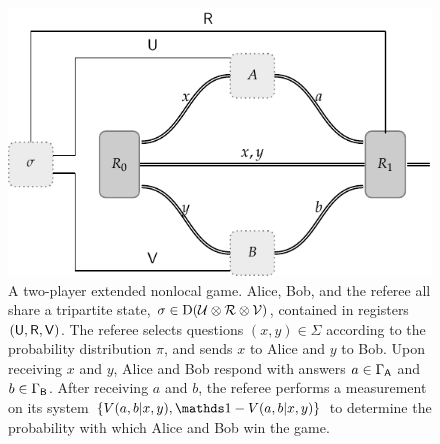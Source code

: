 \begin{figure}[!htpb] \label{fig:extended-nonlocal-game}
	\begin{center}
		\includegraphics[scale=0.9]{figures/enlg_2.pdf}
	\end{center}
		\caption[A two-player extended nonlocal game.]{A two-player extended nonlocal game. Alice, Bob, and the referee all share a tripartite state, $\sigma \in \mathrm{D}(\mathcal{U} \otimes \mathcal{R} \otimes \mathcal{V})$, contained in registers $(\mathsf{U},\mathsf{R},\mathsf{V})$. The referee selects questions $(x,y) \in \Sigma$ according to the probability distribution $\pi$, and sends $x$ to Alice and $y$ to Bob. Upon receiving $x$ and $y$, Alice and Bob respond with answers $a \in \Gamma_{\mathsf{A}}$ and $b \in \Gamma_{\mathsf{B}}$. After receiving $a$ and $b$, the referee performs a measurement on its system $\{ V(a,b|x,y), \I - V(a,b|x,y) \}$ to determine the probability with which Alice and Bob win the game.}
\end{figure}

